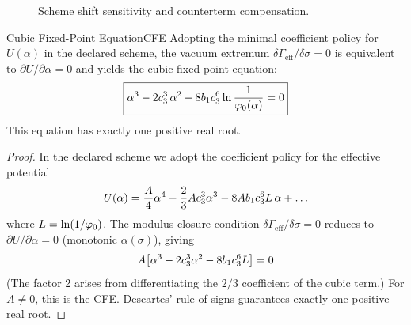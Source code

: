 \begin{figure}[H]
\centering
{}
\caption{Scheme shift sensitivity and counterterm compensation.}
\label{fig:scheme-shift}
\end{figure}

\begin{theorem}{Cubic Fixed-Point Equation}{CFE}
Adopting the minimal coefficient policy for $U(\alpha)$ in the declared scheme, the
vacuum extremum $\delta\Gamma_{\mathrm{eff}}/\delta\sigma=0$ is equivalent to
$\partial U/\partial\alpha = 0$ and yields the cubic fixed-point equation:
\begin{equation}
    \boxed{\alpha^3 - 2c_3^3\,\alpha^2 - 8b_1c_3^6\ln\frac{1}{\varphi_0(\alpha)} = 0}
    \label{eq:CFE}
\end{equation}
This equation has exactly one positive real root.
\end{theorem}

\begin{proof}
In the declared scheme we adopt the coefficient policy for the effective potential
\begin{equation}
    U(\alpha) = \frac{A}{4}\alpha^4 - \frac{2}{3}Ac_3^3\alpha^3 - 8Ab_1c_3^6 L\,\alpha + \ldots
\end{equation}
where $L = \ln(1/\varphi_0)$. The modulus-closure condition 
$\delta\Gamma_{\mathrm{eff}}/\delta\sigma = 0$ reduces to $\partial U/\partial\alpha = 0$
(monotonic $\alpha(\sigma)$), giving
\begin{equation}
    A\bigl[\alpha^3 - 2c_3^3\alpha^2 - 8b_1c_3^6 L\bigr] = 0
\end{equation}
(The factor 2 arises from differentiating the $2/3$ coefficient of the cubic term.)
For $A \neq 0$, this is the CFE. Descartes' rule of signs guarantees exactly 
one positive real root.
\end{proof}

